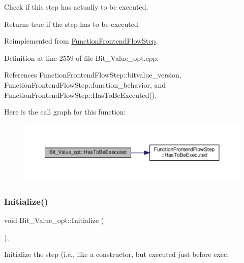 Check if this step has actually to be executed. 

\begin{DoxyReturn}{Returns}
true if the step has to be executed 
\end{DoxyReturn}


Reimplemented from \hyperlink{classFunctionFrontendFlowStep_a12e786363530aa9533e4bd9380130d75}{Function\+Frontend\+Flow\+Step}.



Definition at line 2559 of file Bit\+\_\+\+Value\+\_\+opt.\+cpp.



References Function\+Frontend\+Flow\+Step\+::bitvalue\+\_\+version, Function\+Frontend\+Flow\+Step\+::function\+\_\+behavior, and Function\+Frontend\+Flow\+Step\+::\+Has\+To\+Be\+Executed().

Here is the call graph for this function\+:
\nopagebreak
\begin{figure}[H]
\begin{center}
\leavevmode
\includegraphics[width=350pt]{dc/d5b/classBit__Value__opt_aca5d7fc33c82b8da126592bbd9e84588_cgraph}
\end{center}
\end{figure}
\mbox{\label{classBit__Value__opt_a0034bd25e17bbf5e3fbd6c278ca10f2e}} 
\subsubsection{\texorpdfstring{Initialize()}{Initialize()}}
{\footnotesize\ttfamily void Bit\+\_\+\+Value\+\_\+opt\+::\+Initialize (\begin{DoxyParamCaption}{ }\end{DoxyParamCaption})\hspace{0.3cm}{\ttfamily [override]}, {\ttfamily [virtual]}}



Initialize the step (i.\+e., like a constructor, but executed just before exec. 



